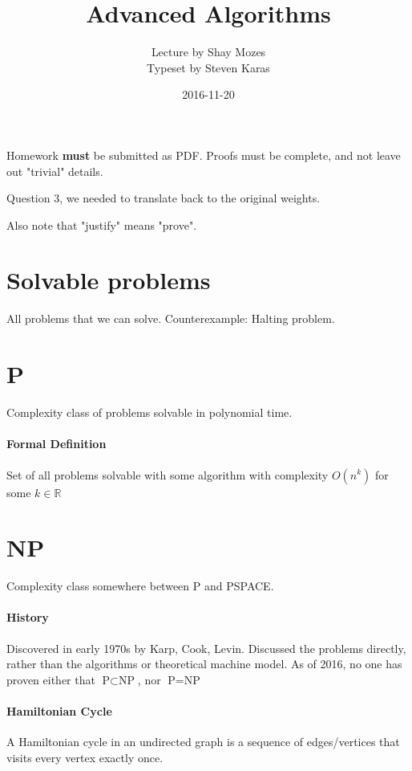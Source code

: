 \documentclass[a4paper]{article}
\title{Advanced Algorithms}
\date{2016-11-20}
\author{Lecture by Shay Mozes\\Typeset by Steven Karas}
\begin{document}
\maketitle

\paragraph{}
Homework {\bf must} be submitted as PDF. Proofs must be complete, and not leave out "trivial" details.

Question 3, we needed to translate back to the original weights.

Also note that "justify" means "prove".

\section{Solvable problems}
All problems that we can solve. Counterexample: Halting problem.

\section{P}
Complexity class of problems solvable in polynomial time.

\paragraph{Formal Definition}
Set of all problems solvable with some algorithm with complexity $O(n^k)$ for some $k \in \mathbb{R}$

\section{NP}
Complexity class somewhere between P and PSPACE.

\paragraph{History}
Discovered in early 1970s by Karp, Cook, Levin. Discussed the problems directly, rather than the algorithms or theoretical machine model. As of 2016, no one has proven either that $\text{P} \subset \text{NP}$, nor $\text{P} = \text{NP}$

\paragraph{Hamiltonian Cycle}
A Hamiltonian cycle in an undirected graph is a sequence of edges/vertices that visits every vertex exactly once.
\end{document}
